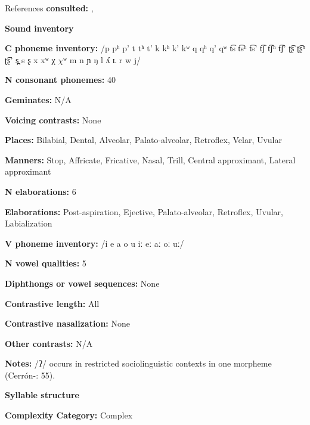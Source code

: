 References \textbf{consulted:} \citet{Cerrón-Palomino2006}, \citet{Olson1967}



\textbf{Sound inventory}



\textbf{C phoneme inventory:} /p pʰ p’ t tʰ t’ k kʰ k’ kʷ q qʰ q’ qʷ t͡s t͡sʰ t͡s’ t͡ʃ t͡ʃʰ t͡ʃ’ ʈ͡ʂ ʈ͡ʂʰ ʈ͡ʂ’ s̪ s ʂ x xʷ χ $\chi ʷ$ m n ɲ ŋ l ʎ ʟ r w j/



\textbf{N consonant phonemes:} 40



\textbf{Geminates:} N/A



\textbf{Voicing contrasts:} None



\textbf{Places:} Bilabial, Dental, Alveolar, Palato-alveolar, Retroflex, Velar, Uvular



\textbf{Manners:} Stop, Affricate, Fricative, Nasal, Trill, Central approximant, Lateral approximant



\textbf{N elaborations:} 6



\textbf{Elaborations:} Post-aspiration, Ejective, Palato-alveolar, Retroflex, Uvular, Labialization



\textbf{V phoneme inventory:} /i e a o u iː eː aː oː uː/



\textbf{N vowel qualities:} 5



\textbf{Diphthongs or vowel sequences:} None



\textbf{Contrastive length:} All



\textbf{Contrastive nasalization:} None



\textbf{Other contrasts:} N/A



\textbf{Notes:} /ʔ/ occurs in restricted sociolinguistic contexts in one morpheme (Cerrón-\citealt{Palomino2006}: 55).



\textbf{Syllable structure}



\textbf{Complexity Category:} Complex



